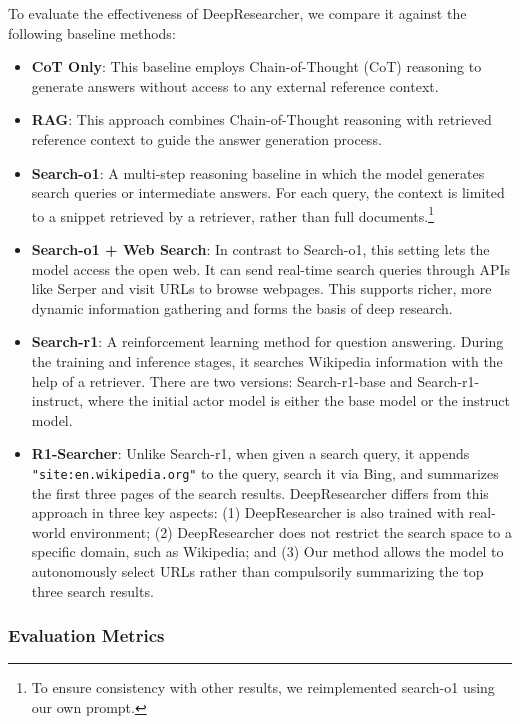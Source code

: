 \documentclass{article}
\newcommand{\scrl}{DeepResearcher\xspace}
\begin{document}
To evaluate the effectiveness of \scrl, we compare it against the following baseline methods:
\begin{itemize}
    \item \textbf{CoT Only}: This baseline employs Chain-of-Thought (CoT) \cite{} reasoning to generate answers without access to any external reference context.
    \item \textbf{RAG}: This approach combines Chain-of-Thought reasoning with retrieved reference context to guide the answer generation process.
    \item \textbf{Search-o1}: A multi-step reasoning baseline in which the model generates search queries or intermediate answers. For each query, the context is limited to a snippet retrieved by a retriever, rather than full documents.\footnote{To ensure consistency with other results, we reimplemented search-o1 using our own prompt.}

    \item \textbf{Search-o1 + Web Search}: In contrast to Search-o1, this setting lets the model access the open web. It can send real-time search queries through APIs like Serper and visit URLs to browse webpages. This supports richer, more dynamic information gathering and forms the basis of deep research.

    \item \textbf{Search-r1}: A reinforcement learning method for question answering. During the training and inference stages, it searches Wikipedia information with the help of a retriever. There are two versions: Search-r1-base and Search-r1-instruct, where the initial actor model is either the base model or the instruct model.

    \item \textbf{R1-Searcher}: Unlike Search-r1, when given a search query, it appends \texttt{"site:en.wikipedia.org"} to the query, search it via Bing, and summarizes the first three pages of the search results. \scrl differs from this approach in three key aspects: (1) \scrl is also trained with real-world environment; (2) \scrl does not restrict the search space to a specific domain, such as Wikipedia; and (3) Our method allows the model to autonomously select URLs rather than compulsorily summarizing the top three search results.
\end{itemize}


\subsubsection{Evaluation Metrics}
\end{document}
